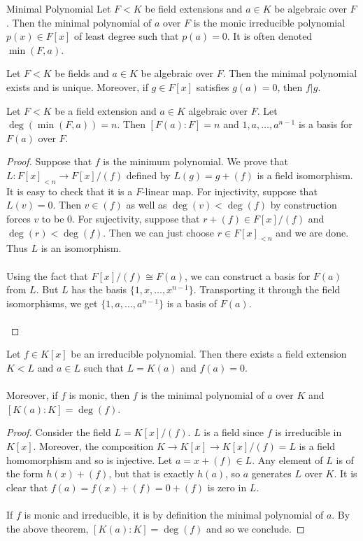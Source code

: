 \documentclass[a4paper]{article}
\begin{document}
\begin{defn}{Minimal Polynomial}{} Let $F<K$ be field extensions and $a\in K$ be algebraic over $F$. Then the minimal polynomial of $a$ over $F$ is the monic irreducible polynomial $p(x)\in F[x]$ of least degree such that $p(a)=0$. It is often denoted $\min(F,a)$. 
\end{defn}

\begin{prp}{}{} Let $F<K$ be fields and $a\in K$ be algebraic over $F$. Then the minimal polynomial exists and is unique. Moreover, if $g\in F[x]$ satisfies $g(a)=0$, then $f|g$. 
\end{prp}

\begin{prp}{}{} Let $F<K$ be a field extension and $a\in K$ algebraic over $F$. Let $\deg(\min(F,a))=n$. Then $[F(a):F]=n$ and $1,a,\dots,a^{n-1}$ is a basis for $F(a)$ over $F$. \tcbline
\begin{proof}
Suppose that $f$ is the minimum polynomial. We prove that $L:F[x]_{<n}\to F[x]/(f)$ defined by $L(g)=g+(f)$ is a field isomorphism. It is easy to check that it is a $F$-linear map. For injectivity, suppose that $L(v)=0$. Then $v\in(f)$ as well as $\deg(v)<\deg(f)$ by construction forces $v$ to be $0$. For sujectivity, suppose that $r+(f)\in F[x]/(f)$ and $\deg(r)<\deg(f)$. Then we can just choose $r\in F[x]_{<n}$ and we are done. Thus $L$ is an isomorphism. \\~\\
Using the fact that $F[x]/(f)\cong F(a)$, we can construct a basis for $F(a)$ from $L$. But $L$ has the basis $\{1,x,\dots,x^{n-1}\}$. Transporting it through the field isomorphisms, we get $\{1,a,\dots,a^{n-1}\}$ is a basis of $F(a)$. \\~\\
\end{proof}
\end{prp}

\begin{prp}{}{} Let $f\in K[x]$ be an irreducible polynomial. Then there exists a field extension $K<L$ and $a\in L$ such that $L=K(a)$ and $f(a)=0$. \\~\\

Moreover, if $f$ is monic, then $f$ is the minimal polynomial of $a$ over $K$ and $[K(a):K]=\deg(f)$. \tcbline
\begin{proof}
Consider the field $L=K[x]/(f)$. $L$ is a field since $f$ is irreducible in $K[x]$. Moreover, the composition $K\to K[x]\to K[x]/(f)=L$ is a field homomorphism and so is injective. Let $a=x+(f)\in L$. Any element of $L$ is of the form $h(x)+(f)$, but that is exactly $h(a)$, so $a$ generates $L$ over $K$. It is clear that $f(a)=f(x)+(f)=0+(f)$ is zero in $L$. \\~\\

If $f$ is monic and irreducible, it is by definition the minimal polynomial of $a$. By the above theorem, $[K(a):K]=\deg(f)$ and so we conclude. 
\end{proof}
\end{prp}
\end{document}
